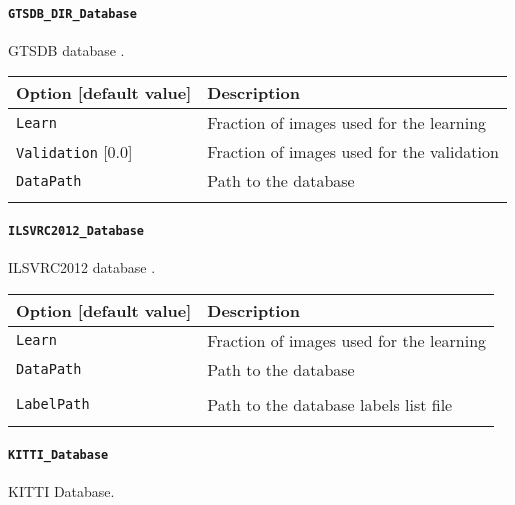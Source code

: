 \documentclass[a4paper,11pt,oneside]{article}
\begin{document}
\paragraph{\texorpdfstring{%
\lstinline[basicstyle=\ttfamily\bfseries]!GTSDB_DIR_Database!}
{GTSDB\_DIR\_Database}}
GTSDB database \citep{Houben2013}.

\begin{center}
 \begin{tabular}{| p{5cm} | p{10cm} | }
 \hline
 Option [default value] & Description\\
 \hline\hline
  \lstinline!Learn! & Fraction of images used for the learning \\
  \lstinline!Validation! [0.0] & Fraction of images used for the validation \\
  \lstinline!DataPath! & Path to the database \\
   & \\
 \hline
\end{tabular}
\end{center}


\paragraph{\texorpdfstring{%
\lstinline[basicstyle=\ttfamily\bfseries]!ILSVRC2012_Database!}
{ILSVRC2012\_Database}}
ILSVRC2012 database \citep{ILSVRC15}.

\begin{center}
 \begin{tabular}{| p{5cm} | p{10cm} | }
 \hline
 Option [default value] & Description\\
 \hline\hline
  \cellcolor{requiredcolor}
  \lstinline!Learn! & Fraction of images used for the learning \\
  \lstinline!DataPath! & Path to the database \\
   & \\
  \lstinline!LabelPath! & Path to the database labels list file \\
  \noindent [\lstinline!$N2D2_DATA!/ILSVRC2012/synsets.txt] & \\
 \hline
\end{tabular}
\end{center}

\paragraph{\texorpdfstring{%
\lstinline[basicstyle=\ttfamily\bfseries]!KITTI_Database!}{KITTI\_Database}}
KITTI Database.
\end{document}
